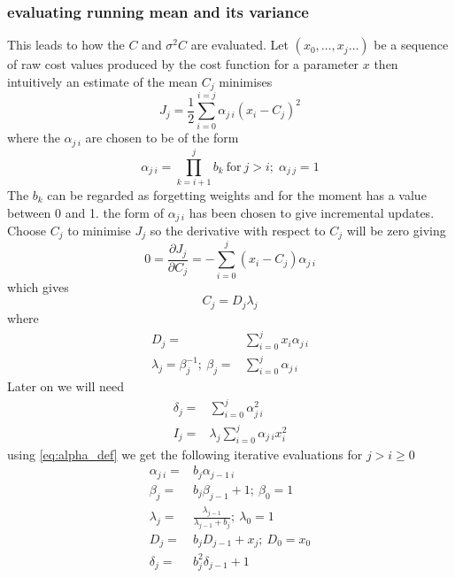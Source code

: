 \documentclass[a4paper,oneside,english]{book}
\numberwithin{equation}{section}
\numberwithin{figure}{section}
\begin{document}
\subsubsection{ evaluating running mean and its variance}
This leads to how the $C$ and $\sigma ^2C$ are evaluated. Let $(x_0, \ldots, x_ j \dots )$ be a sequence of raw cost values produced by the cost function for a  parameter $x$ then intuitively an estimate of the mean $C_j$ minimises
\begin{equation}\label{eq:J_j}
J_j=\frac{1}{2}\sum_{i=0}^{i=j}\alpha_{j\:i}(x_i-C_j)^2
\end{equation}
where the $\alpha_{j\:i}$ are chosen to be of the form 
\begin{equation}\label{eq:alpha_def}
\alpha_{j\:i}=\prod_{k=i+1}^{j}b_k\: \mathrm{for}\: j>i ;\; \alpha_{j\:j}=1
\end{equation}
The $b_k$ can be regarded as forgetting weights and for the moment has a value between 0 and 1. the form of $\alpha_{j\:i}$  has been chosen to give incremental updates. Choose $C_j$ to minimise $J_j$ so the derivative with respect to $C_j$ will be zero giving
\begin{equation}\label{eq:J_zero_diff}
0=\dfrac{\partial J_j}{\partial C_j} =-\sum_{i=0}^j (x_i-C_j)\alpha_{j\:i}
\end{equation}
which gives
\begin{equation}\label{eq:C_j_def}
 C_j= D_j \lambda_j
\end{equation}
where
\begin{align}
D_j =&\sum_{i=0}^j x_i \alpha_{j\:i}\label{eq:D_j_def} \\
\lambda_j=\beta_j^{-1};\:\beta_j=&\sum_{i=0}^j \alpha_{j\:i}\label{ eq:lambda_j_def}
\end{align}
Later on we will need
\begin{align}\label{delta_j_def}
\delta_j=&\sum_{i=0}^j \alpha_{j\:i}^2\\
I_j=&\lambda_j \sum_{i=0}^j \alpha_{j\:i} x_i^2
\end{align} 
using \ref{eq:alpha_def} we get the following iterative evaluations for $j > i\geq 0$
\begin{align}
\alpha_{j\:i}=&b_j \alpha_{j-1\:i}\\
\beta_j=&b_j \beta_{j-1} + 1;\:\beta_0=1 \label{eq:beta_j_iter}\\
\lambda_j=&\frac{\lambda_{j-1}}{\lambda_{j-1} + b_j} ; \: \lambda_0=1  \label{eq:lambda_iter}\\
D_j=&b_j D_{j-1} + x_j ; \: D_0=x_0\\
\delta_j=& b_j^2 \delta_{j-1}+1 \label{eq:delta_iter}
\end{align}
\end{document}
